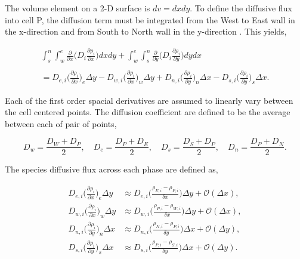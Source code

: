 \noindent The volume element on a 2-D surface is $dv = dxdy$. To define the diffusive flux into cell P, the diffusion term must be integrated from the West to East wall in the x-direction and from South to North wall in the y-direction \cite{versteeg2007}. This yields,

\begin{equation}
\begin{split}
    \int_{s}^{n}\int_{w}^{e}\frac{\partial }{\partial x}\bigg( D_{i}\frac{\partial \rho_{i}}{\partial x}\bigg)dxdy + \int_{w}^{e}\int_{s}^{n}\frac{\partial }{\partial y}\bigg( D_{i}\frac{\partial \rho_{i}}{\partial y}\bigg)dydx \\ 
    \\
    = D_{e,i}\bigg(\frac{\partial \rho_{i}}{\partial x}\bigg)_{e}\Delta y -D_{w,i}\bigg(\frac{\partial \rho_{i}}{\partial x}\bigg)_{w}\Delta y
    + D_{n,i}\bigg(\frac{\partial \rho_{i}}{\partial y}\bigg)_{n}\Delta x - D_{s,i}\bigg(\frac{\partial \rho_{i}}{\partial y}\bigg)_{s}\Delta x.
\end{split}
\end{equation}

\noindent Each of the first order spacial derivatives are assumed to linearly vary between the cell centered points. The diffusion coefficient are defined to be the average between each of pair of points,

\begin{equation}
    D_{w} =\frac{D_{W} + D_{P}}{2}, \quad D_{e} =\frac{D_{P} + D_{E}}{2}, \quad D_{s} =\frac{D_{S} + D_{P}}{2}, \quad D_{n} =\frac{D_{P} + D_{N}}{2}. 
\end{equation}

\noindent The species diffusive flux across each phase are defined as,

\begin{equation}
\begin{split}
    D_{e,i}\bigg(\frac{\partial \rho_{i}}{\partial x}\bigg)_{e}\Delta y &\approx
    D_{e,i}\bigg(\frac{\rho_{E,i} - \rho_{P,i}}{\delta x}\bigg)\Delta y +
    \mathcal{O}(\Delta x),
    \\
    D_{w,i}\bigg(\frac{\partial \rho_{i}}{\partial x}\bigg)_{w}\Delta y &\approx
    D_{w,i}\bigg(\frac{\rho_{P,i} - \rho_{W,i}}{\delta x}\bigg)\Delta y + \mathcal{O}(\Delta x),
    \\
    D_{n,i}\bigg(\frac{\partial \rho_{i}}{\partial y}\bigg)_{n}\Delta x &\approx
    D_{n,i}\bigg(\frac{\rho_{N,i} - \rho_{P,i}}{\delta y}\bigg)\Delta x +
    \mathcal{O}(\Delta y),
    \\
    D_{s,i}\bigg(\frac{\partial \rho_{i}}{\partial y}\bigg)_{s}\Delta x &\approx
    D_{s,i}\bigg(\frac{\rho_{P,i} - \rho_{S,i}}{\delta y}\bigg)\Delta x +
    \mathcal{O}(\Delta y).
\end{split}
\end{equation}

